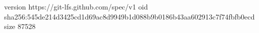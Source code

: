 version https://git-lfs.github.com/spec/v1
oid sha256:545de214d3425cd1d69ac8d9949b1d088b9b0186b43aa602913c7f74fbfb0ecd
size 87528
